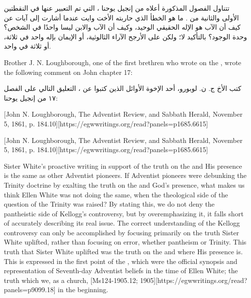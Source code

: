 تتناول الفصول المذكورة أعلاه من إنجيل يوحنا ، التي تم التعبير عنها في النقطتين الأولى والثانية من . ما هو الخطأ الذي حاربته الأخت وايت عندما أشارت إلى آيات عن كيف أن الآب هو الإله الحقيقي الوحيد، وكيف أن الآب والابن ليسا واحدًا في الشخص؟ وحدة الوجود؟ بالتأكيد لا؛ ولكن على الأرجح الآراء الثالوثية، أو الإيمان بإله واحد في ثلاثة، أو ثلاثة في واحد.


Brother J. N. Loughborough, one of the first brethren who wrote on the , wrote the following comment on John chapter 17:


كتب الأخ ج. ن. لوبورو، أحد الإخوة الأوائل الذين كتبوا عن ، التعليق التالي على الفصل ١٧ من إنجيل يوحنا:


[John N. Loughborough, The Adventist Review, and Sabbath Herald, November 5, 1861, p. 184.10][https://egwwritings.org/read?panels=p1685.6615]


[John N. Loughborough, The Adventist Review, and Sabbath Herald, November 5, 1861, p. 184.10][https://egwwritings.org/read?panels=p1685.6615]


Sister White’s proactive writing in support of the truth on the  and His presence is the same as other Adventist pioneers. If Adventist pioneers were debunking the Trinity doctrine by exalting the truth on the  and God’s presence, what makes us think Ellen White was not doing the same, when the theological side of the question of the Trinity was raised? By stating this, we do not deny the pantheistic side of Kellogg’s controversy, but by overemphasizing it, it falls short of accurately describing its real issue. The correct understanding of the Kellogg controversy can only be accomplished by focusing primarily on the truth Sister White uplifted, rather than focusing on error, whether pantheism or Trinity. This truth that Sister White uplifted was the truth on the  and where His presence is. This is expressed in the first point of the , which were the official synopsis and representation of Seventh-day Adventist beliefs in the time of Ellen White; the truth which we, as a church, [Ms124-1905.12; 1905][https://egwwritings.org/read?panels=p9099.18] in the beginning.


